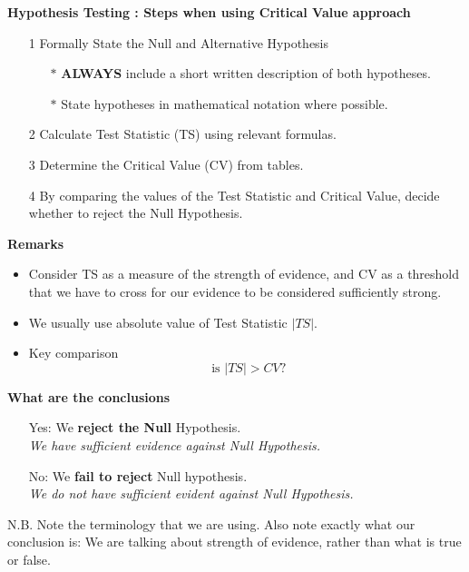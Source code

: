 \documentclass[a4paper,12pt]{article}
\begin{document}
	\begin{framed}
		\noindent \textbf{Hypothesis Testing : Steps when using Critical Value approach}
		
		\begin{itemize}
			\item[1] Formally State the Null and Alternative Hypothesis \smallskip
			{
				\begin{itemize}
					\item[$\ast$] \textbf{ALWAYS} include a short written description of both hypotheses.
					\item[$\ast$] State hypotheses in mathematical notation where possible.
					
				\end{itemize}
			}
			\item[2] Calculate Test Statistic (TS) using relevant formulas.\smallskip
			\item[3] Determine the Critical Value (CV) from tables. \smallskip
			\item[4] By comparing the values of the Test Statistic and Critical Value, decide whether to reject the Null Hypothesis.
		\end{itemize}
	\end{framed}
	
	\noindent \textbf{Remarks}
	\begin{itemize} 
		\item Consider TS as a measure of the strength of evidence, and CV as a threshold that we have to cross for our evidence to be considered sufficiently strong.
		\item We usually use absolute value of Test Statistic $|TS|$.
		\item Key comparison
		\[ \mbox{ is } |TS| > CV \mbox{?} \]
	\end{itemize}	
	
	
	\noindent \textbf{What are the conclusions}
	\begin{itemize} 
		
		\item[Yes:] We \textbf{reject the Null} Hypothesis. \\ \textit{We have sufficient evidence against Null Hypothesis.}
		
		\item[No:] We \textbf{fail to reject} Null hypothesis. \\ \textit{We do not have sufficient evident against Null Hypothesis.}
	\end{itemize}	
	{	\normalsize
		N.B. Note the terminology that we are using. Also note exactly what our conclusion is: We are talking about strength of evidence, rather than what is true or false.}
	
\end{document}
